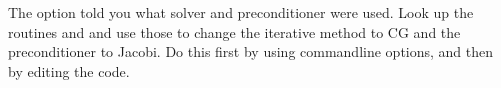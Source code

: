   The  option told you what solver and preconditioner
  were used. Look up the routines  and  and
  use those to change the iterative method to CG and the
  preconditioner to Jacobi. Do this first by using commandline
  options, and then by editing the code.
